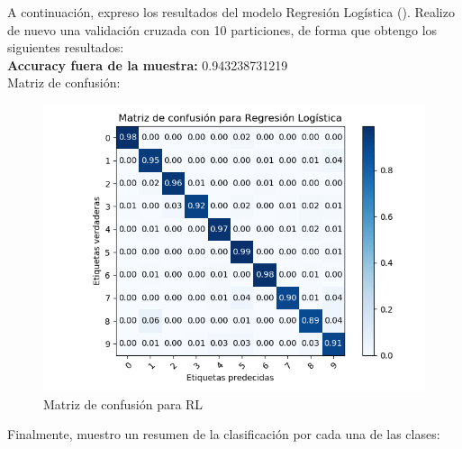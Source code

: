 A continuación, expreso los resultados del modelo Regresión Logística (\cite{lr}). Realizo de nuevo una validación cruzada con 10 particiones, de forma que obtengo los siguientes resultados: \\

\textbf{Accuracy fuera de la muestra:} 0.943238731219 \\

Matriz de confusión:

\begin{figure}[H] %
	\centering
	\includegraphics[scale=0.8]{conf-m-rl.png}  %
	\caption{Matriz de confusión para RL} 
	\label{fig:conf-m-rl}
\end{figure}

Finalmente, muestro un resumen de la clasificación por cada una de las clases:

